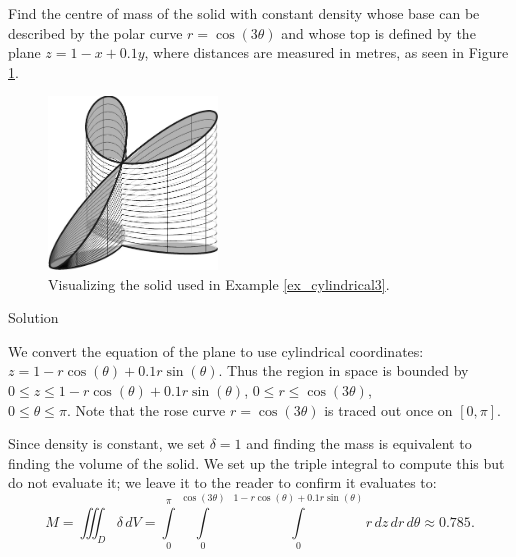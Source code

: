 \begin{example}
\label{ex_cylindrical3}
Find the centre of mass of the solid with constant density whose base can be described by the polar curve $r=\cos(3\theta)$ and whose top is defined by the plane $z=1-x+0.1y$, where distances are measured in metres, as seen in Figure \ref{fig_multiple_30}.

\begin{figure}[H]
	\begin{center}
			\includegraphics[width=0.4\textwidth]{fig_multiple_30}
	\caption{Visualizing the solid used in Example \ref{ex_cylindrical3}.}
	\label{fig_multiple_30}
	\end{center}
\end{figure}

Solution 


We convert the equation of the plane to use cylindrical coordinates: $z= 1-r\cos(\theta)+0.1r\sin(\theta)$. Thus the region in space is bounded by $0 \leq z \leq 1-r\cos(\theta) + 0.1r\sin(\theta)$, $0 \leq r \leq \cos(3\theta)$, \\ $0 \leq \theta \leq \pi$. Note that the rose curve $r=\cos(3\theta)$ is traced out once on $[0,\pi]$.


Since density is constant, we set $\delta = 1$ and finding the mass is equivalent to finding the volume of the solid. We set up the triple integral to compute this but do not evaluate it; we leave it to the reader to confirm it evaluates to:
$$M = \iiint_D\delta \, dV = \int\limits_0^{\pi}\int\limits_0^{\cos(3\theta)}\ \int\limits_0^{1-r\cos(\theta)+0.1r\sin(\theta)} r\,dz\,dr\,d\theta \approx 0.785.$$


\end{example}
